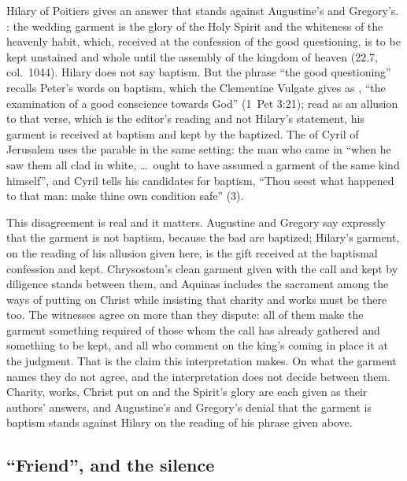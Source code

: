 Hilary of Poitiers gives an answer that stands against Augustine's and
Gregory's. : the wedding garment is
the glory of the Holy Spirit and the whiteness of the heavenly habit, which,
received at the confession of the good questioning, is to be kept unstained and
whole until the assembly of the kingdom of heaven (22.7, col.~1044). Hilary
does not say baptism. But the phrase ``the good questioning'' recalls Peter's
words on baptism, which the Clementine Vulgate gives as , ``the examination of a good conscience towards
God'' (1~Pet 3:21); read as an allusion to that verse, which is the editor's
reading and not Hilary's statement, his garment is received at baptism and kept
by the baptized. The  of Cyril of Jerusalem uses the parable
in the same setting: the man who came in ``when he saw them all clad in white,
\ldots\ ought to have assumed a garment of the same kind himself'', and Cyril
tells his candidates for baptism, ``Thou seest what happened to that man: make
thine own condition safe'' (3).

This disagreement is real and it matters. Augustine and Gregory say expressly
that the garment is not baptism, because the bad are baptized; Hilary's
garment, on the reading of his allusion given here, is the gift received at the
baptismal confession and kept. Chrysostom's clean garment given with the call
and kept by diligence stands between them, and Aquinas includes the sacrament
among the ways of putting on Christ while insisting that charity and works
must be there too. The witnesses agree on more than they dispute: all of them
make the garment something required of those whom the call has already
gathered and something to be kept, and all who comment on the king's coming
in place it at the judgment. That is the claim this interpretation makes. On
what the garment names they do not agree, and the interpretation does not
decide between them. Charity, works, Christ put on and the Spirit's glory are
each given as their authors' answers, and Augustine's and Gregory's denial
that the garment is baptism stands against Hilary on the reading of his phrase
given above.

\subsection{``Friend'', and the silence}

